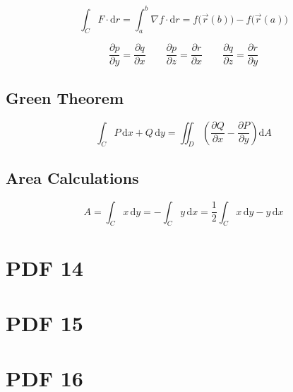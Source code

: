 \documentclass[12pt, fleqn]{book}
\begin{document}
    	\begin{equation}
    		\int_{C} F \cdot \mathrm{d}r = \int_{a}^{b} \nabla f \cdot \mathrm{d}r = f\big(\vec{r}(b)\big) - f\big(\vec{r}(a)\big)
    	\end{equation}     
    	
    	\begin{equation}
   			\frac{\partial p}{\partial y} = \frac{\partial q}{\partial x} \qquad
   			\frac{\partial p}{\partial z} = \frac{\partial r}{\partial x} \qquad
   			\frac{\partial q}{\partial z} = \frac{\partial r}{\partial y}
    	\end{equation}
    
    \section{Green Theorem}
    	\begin{equation}
    		\int_{C} P \, \mathrm{d}x + Q \, \mathrm{d}y = \iint_{D} \left(\frac{\partial Q}{\partial x} - \frac{\partial P}{\partial y}\right) \mathrm{d}A
    	\end{equation}
    
    \section{Area Calculations}
    	\begin{equation}
    		A = \int_{C} x \, \mathrm{d}y = - \int_{C} y \, \mathrm{d}x = \frac{1}{2} \int_{C} x \, \mathrm{d}y - y \, \mathrm{d}x
    	\end{equation}
    
    
\chapter{PDF 14}\label{pdf14}
\chapter{PDF 15}\label{pdf15}
\chapter{PDF 16}\label{pdf16}
\end{document}
